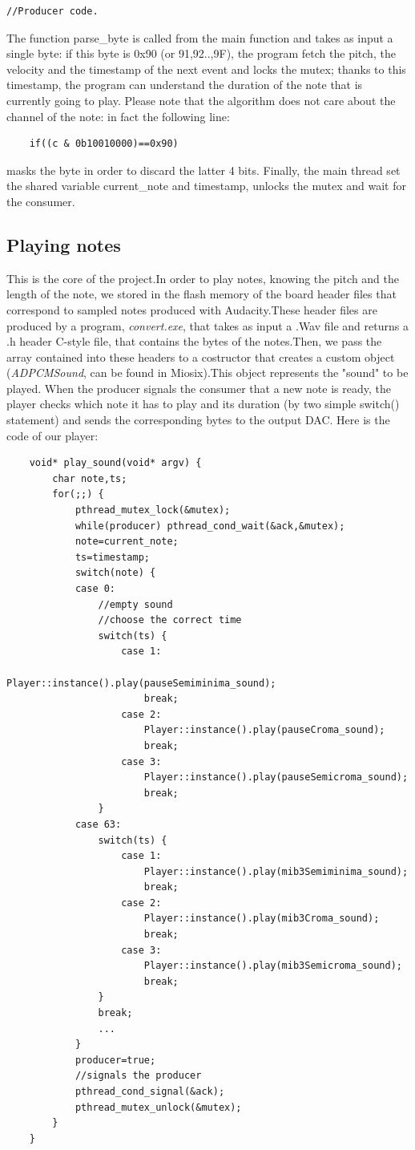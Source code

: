 \documentclass[12pt]{article}
\begin{document}
\begin{lstlisting}
//Producer code.
\end{lstlisting}

The function parse\_byte is called from the main function and takes as input a single byte: if this byte is 0x90 (or 91,92..,9F), the program fetch the pitch, the velocity and the timestamp of the next event and locks the mutex; thanks to this timestamp, the program can understand the duration of the note that is currently going to play. Please note that the algorithm does not care about the channel of the note: in fact the following line:
\begin{lstlisting}
	if((c & 0b10010000)==0x90)
\end{lstlisting}
masks the byte in order to discard the latter 4 bits.\newline
Finally, the main thread set the shared variable current\_note and timestamp, unlocks the mutex and wait for the consumer.

\subsection{Playing notes}
This is the core of the project.In order to play notes, knowing the pitch and the length of the note, we stored in the flash memory of the board header files that correspond to sampled notes produced with Audacity.These header files are produced by a program, \textit{convert.exe}, that takes as input a .Wav file and returns a .h header C-style file, that contains the bytes of the notes.Then, we pass the array contained into these headers to a costructor that creates a custom object (\textit{ADPCMSound}, can be found in Miosix).This object represents the "sound" to be played.\newline
 When the producer signals the consumer that a new note is ready, the player checks which note it has to play and its duration (by two simple switch() statement) and sends the corresponding bytes to the output DAC. Here is the code of our player:

\begin{lstlisting}
	void* play_sound(void* argv) {
		char note,ts;
		for(;;) {
			pthread_mutex_lock(&mutex);
			while(producer) pthread_cond_wait(&ack,&mutex);
			note=current_note;
			ts=timestamp;
			switch(note) {
			case 0:
				//empty sound
				//choose the correct time
				switch(ts) {
					case 1:
						Player::instance().play(pauseSemiminima_sound);
						break;
					case 2:
						Player::instance().play(pauseCroma_sound);
						break;
					case 3:
						Player::instance().play(pauseSemicroma_sound);
						break;
				}
			case 63:
				switch(ts) {
					case 1:
						Player::instance().play(mib3Semiminima_sound);
						break;
					case 2:
						Player::instance().play(mib3Croma_sound);
						break;
					case 3:
						Player::instance().play(mib3Semicroma_sound);
						break;
				}
				break;
				...
			}
			producer=true;
			//signals the producer
			pthread_cond_signal(&ack);
			pthread_mutex_unlock(&mutex);
		}
	}
\end{lstlisting}
\end{document}

